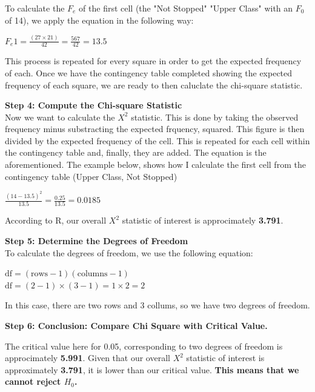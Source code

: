 \documentclass[12pt,letterpaper]{article}
\begin{document}
\begin{enumerate}
To calculate the $F_e$ of the first cell (the "Not Stopped" "Upper Class" with an $F_0$ of 14), we apply the equation in the following way:\\ 
\begin{center}
$F_e{1} = \frac{(27 \times 21)}{42} = \frac{567}{42} = 13.5$
\end{center}

This process is repeated for every square in order to get the expected frequency of each. Once we have the contingency table completed showing the expected frequency of each square, we are ready to then caluclate the chi-square statistic. 

\textbf{Step 4: Compute the Chi-square Statistic}\\

Now we want to calculate the  $X^2$ statistic. This is done by taking the observed frequency minus substracting the expected frquency, squared. This figure is then divided by the expected frequency of the cell. This is repeated for each cell within the contingency table and, finally, they are added. The equation is the aforementioned. The example below, shows how I calculate the first cell from the contingency table (Upper Class, Not Stopped)
\begin{center}
$\frac{(14 - 13.5)^2}{13.5} = \frac{0.25}{13.5} = 0.0185$
\end{center}

According to R, our overall $X^2$ statistic of interest is approcimately \textbf{3.791}. 

\textbf{Step 5: Determine the Degrees of Freedom}\\

To calculate the degrees of freedom, we use the following equation:\\ 
\begin{center}
$\text{df} = (\text{rows} - 1)(\text{columns} - 1)$\\

$\text{df} = (2 - 1) \times (3 - 1) = 1 \times 2 = 2$
\end{center}

In this case, there are two rows and 3 collums, so we have two degrees of freedom. 

\textbf{Step 6: Conclusion: Compare Chi Square with Critical Value.}

The critical value here for 0.05, corresponding to two degrees of freedom is approcimately \textbf{5.991}. Given that our overall $X^2$ statistic of interest is approximately \textbf{3.791}, it is lower than our critical value. \textbf{This means that we cannot reject $H_0$.}  


\end{enumerate}
\end{document}
